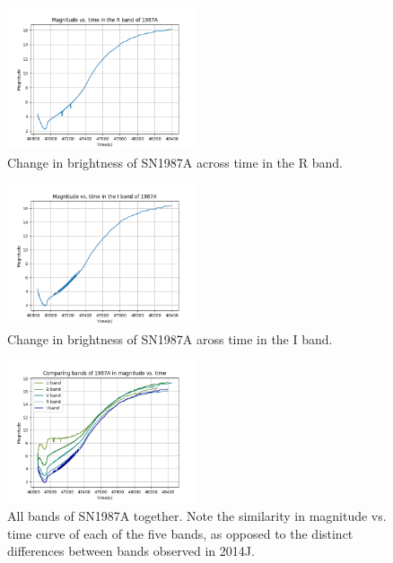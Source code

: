 \begin{figure}[htp]
	\includegraphics[width=0.5\textwidth]{1987A_R_magvstime.png}
	\caption{Change in brightness of SN1987A across time in the R band.}
\end{figure}
\begin{figure}[htp]
	\includegraphics[width=0.5\textwidth]{1987A_I_magvstime.png}
	\caption{Change in brightness of SN1987A aross time in the I band.}
\end{figure}
\begin{figure}[htp]
	\includegraphics[width=0.5\textwidth]{1987A_all_magvstime.png}
	\caption{All bands of SN1987A together. Note the similarity in magnitude vs. time curve of each of the five bands, as opposed to the distinct differences between bands observed in 2014J.}
\end{figure}
